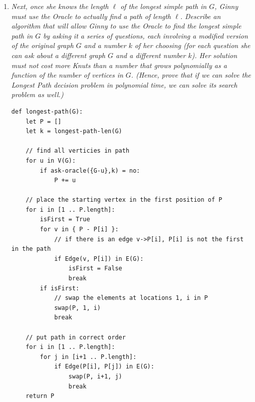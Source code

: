 \documentclass[12pt]{article} \setlength{\oddsidemargin}{0in}
\begin{document}
\begin{enumerate}
\pagebreak

\item\textit{Next, once she knows the length $\ell$ of the longest simple path in $G$, Ginny must use the Oracle to actually find a path of length $\ell$. Describe an algorithm that will allow Ginny to use the Oracle to find the longest simple path in $G$ by asking it a series of questions, each involving a modified version of the original graph $G$ and a number $k$ of her choosing (for each question she can ask about a different graph $G$ and a different number $k$). Her solution must not cost more Knuts than a number that grows polynomially as a function of the number of vertices in $G$. (Hence, prove that if we can solve the Longest Path decision problem in polynomial time, we can solve its search problem as well.)}

\begin{verbatim}
def longest-path(G):
    let P = []
    let k = longest-path-len(G)

    // find all verticies in path
    for u in V(G):
        if ask-oracle({G-u},k) = no:
            P += u

    // place the starting vertex in the first position of P
    for i in [1 .. P.length]:
        isFirst = True
        for v in { P - P[i] }:
            // if there is an edge v->P[i], P[i] is not the first in the path
            if Edge(v, P[i]) in E(G):
                isFirst = False
                break
        if isFirst:
            // swap the elements at locations 1, i in P
            swap(P, 1, i)
            break

    // put path in correct order
    for i in [1 .. P.length]:
        for j in [i+1 .. P.length]:
            if Edge(P[i], P[j]) in E(G):
                swap(P, i+1, j)
                break
    return P
\end{verbatim}

\pagebreak

\end{enumerate}
\end{document}
